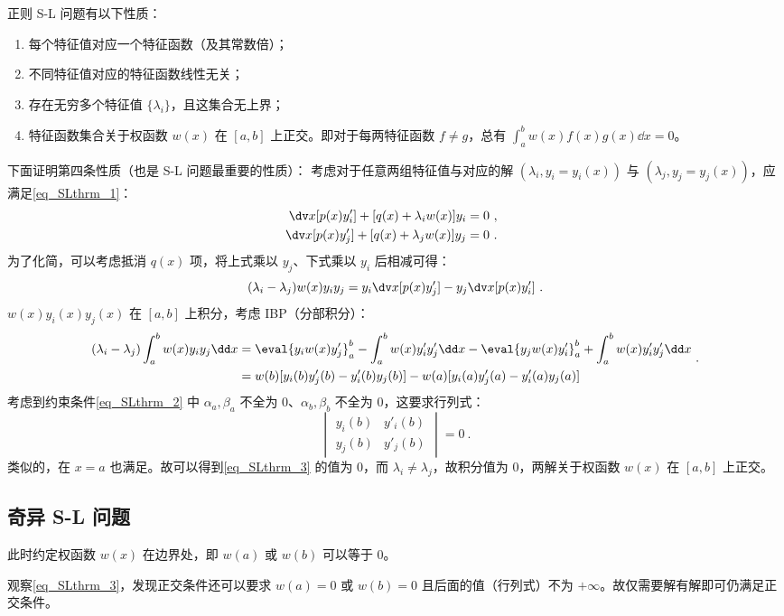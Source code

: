 正则 S-L 问题有以下性质：
\begin{enumerate}
\item 每个特征值对应一个特征函数（及其常数倍）；
\item 不同特征值对应的特征函数线性无关；
\item 存在无穷多个特征值 $\{\lambda_i\}$，且这集合无上界；
\item 特征函数集合关于权函数 $w(x)$ 在 $[a,b]$ 上正交。即对于每两特征函数 $f \neq g$，总有 $\int_a^b w(x)f(x)g(x) \dd x = 0$。 
\end{enumerate}
下面证明第四条性质（也是 S-L 问题最重要的性质）：
考虑对于任意两组特征值与对应的解 $(\lambda_i, y_i=y_i(x))$ 与 $(\lambda_j, y_j=y_j(x))$，应满足\autoref{eq_SLthrm_1}：
\begin{equation}
\begin{aligned}
\dv x [p(x) y'_i] + [q(x) + \lambda_i w(x)] y_i &= 0 ~,\\
\dv x [p(x) y'_j] + [q(x) + \lambda_j w(x)] y_j &= 0 ~.
\end{aligned} ~~
\end{equation}
为了化简，可以考虑抵消 $q(x)$ 项，将上式乘以 $y_j$、下式乘以 $y_i$ 后相减可得：
\begin{equation}
(\lambda_i - \lambda_j)w(x) y_i y_j = y_i \dv x [p(x) y'_j] - y_j \dv x [p(x) y'_i] ~.
\end{equation}
$w(x)y_i(x) y_j(x)$ 在 $[a, b]$ 上积分，考虑 IBP（分部积分）：
\begin{equation}\label{eq_SLthrm_3}
\begin{aligned}
(\lambda_i - \lambda_j) \int_a^b w(x) y_i y_j \dd x &= \eval{y_i w(x) y'_j}_a^b - \int_a^b w(x) y'_i y'_j \dd x - \eval{y_j w(x) y'_i}_a^b + \int_a^b w(x) y'_i y'_j \dd x\\
&= w(b) [y_i(b) y'_j(b) - y'_i(b) y_j(b)] - w(a) [y_i(a) y'_j(a) - y'_i(a) y_j(a)] 
\end{aligned} ~.
\end{equation}
考虑到约束条件\autoref{eq_SLthrm_2} 中 $\alpha_a, \beta_a$ 不全为 $0$、$\alpha_b, \beta_b$ 不全为 $0$，这要求行列式：
\begin{equation}
\begin{vmatrix}
y_i(b) & y'_i(b) \\
y_j(b) & y'_j(b)
\end{vmatrix} = 0~.
\end{equation}
类似的，在 $x=a$ 也满足。故可以得到\autoref{eq_SLthrm_3} 的值为 $0$，而 $\lambda_i \neq \lambda_j$，故积分值为 $0$，两解关于权函数 $w(x)$ 在 $[a, b]$ 上正交。


\subsection{奇异 S-L 问题}
此时约定权函数 $w(x)$ 在边界处，即 $w(a)$ 或 $w(b)$ 可以等于 $0$。

观察\autoref{eq_SLthrm_3}，发现正交条件还可以要求 $w(a) = 0$ 或 $w(b) = 0$ 且后面的值（行列式）不为 $+\infty$。故仅需要解有解即可仍满足正交条件。



 


